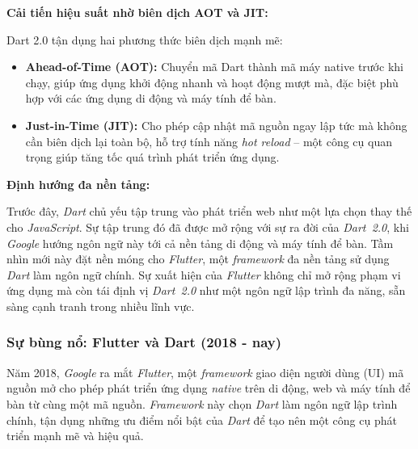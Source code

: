 \documentclass[../DoAn.tex]{subfiles}
\numberwithin{figure}{chapter}
\begin{document}
    \textbf{Cải tiến hiệu suất nhờ biên dịch AOT và JIT:} 
    
    Dart 2.0 tận dụng hai phương thức biên dịch mạnh mẽ:

    \begin{itemize}
        \item \textbf{Ahead-of-Time (AOT):} Chuyển mã Dart thành mã máy native trước khi chạy, giúp ứng dụng khởi động nhanh và hoạt động mượt mà, đặc biệt phù hợp với các ứng dụng di động và máy tính để bàn.
        \item \textbf{Just-in-Time (JIT):} Cho phép cập nhật mã nguồn ngay lập tức mà không cần biên dịch lại toàn bộ, hỗ trợ tính năng \textit{hot reload} – một công cụ quan trọng giúp tăng tốc quá trình phát triển ứng dụng.
    \end{itemize}

    \textbf{Định hướng đa nền tảng:} 
    
 Trước đây, \textit{Dart} chủ yếu tập trung vào phát triển web như một lựa chọn thay thế cho \textit{JavaScript}. Sự tập trung đó đã được mở rộng với sự ra đời của \textit{Dart~2.0}, khi \textit{Google} hướng ngôn ngữ này tới cả nền tảng di động và máy tính để bàn. Tầm nhìn mới này đặt nền móng cho \textit{Flutter}, một \textit{framework} đa nền tảng sử dụng \textit{Dart} làm ngôn ngữ chính. Sự xuất hiện của \textit{Flutter} không chỉ mở rộng phạm vi ứng dụng mà còn tái định vị \textit{Dart~2.0} như một ngôn ngữ lập trình đa năng, sẵn sàng cạnh tranh trong nhiều lĩnh vực.









\subsubsection{Sự bùng nổ: Flutter và Dart (2018 - nay)}

Năm 2018, \textit{Google} ra mắt \textit{Flutter}, một \textit{framework} giao diện người dùng (UI) mã nguồn mở cho phép phát triển ứng dụng \textit{native} trên di động, web và máy tính để bàn từ cùng một mã nguồn. \textit{Framework} này chọn \textit{Dart} làm ngôn ngữ lập trình chính, tận dụng những ưu điểm nổi bật của \textit{Dart} để tạo nên một công cụ phát triển mạnh mẽ và hiệu quả.
\end{document}
